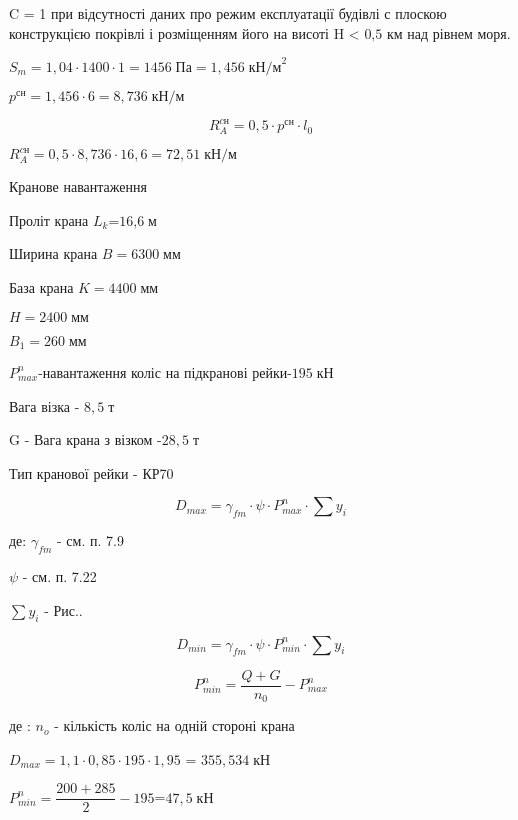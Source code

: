 \documentclass[a4paper,14pt]{article}
\begin{document}
C = 1 при відсутності даних про режим експлуатації будівлі с плоскою конструкцією покрівлі і розміщенням його на висоті H < ${\textit{0,5}}$ км над рівнем моря.

$S_m=1,04\cdot 1400\cdot 1=1456\;\textit{Па}=1,456\;{\textit{кН/м}}^2$

$p^{\textit{сн}}=1,456\cdot 6=8,736\;\textit{кН/м}$

\begin{equation}
    R^{\textit{cн}}_A=0,5\cdot p^{\textit{сн}}\cdot l_0
\end{equation}

$R^{\textit{cн}}_A=0,5\cdot 8,736 \cdot 16,6 = 72,51\;\textit{кН/м}$

Кранове навантаження

Проліт крана $L_k$=$\textit{16,6}\;\textit{м}$

Ширина крана $B=6300\;\textit{мм}$

База крана $K=4400\;\textit{мм}$

$H=2400\;\textit{мм}$

$B_1=260\;\textit{мм}$

$P^n_{max}$-навантаження коліс на підкранові рейки-$195\;\textit{кН}$

Вага візка - $8,5\;\textit{т}$

G - Вага крана з візком -$28,5\;\textit{т}$

Тип кранової рейки - КР70



\begin{equation}
    D_{max}=\gamma_{fm}\cdot \psi \cdot P^n_{max} \cdot \sum y_i
\end{equation}

де: $\gamma_{fm}$ - см. п. 7.9 %

$\psi$ - см. п. 7.22 %

$\sum y_i$ - Рис..

\begin{equation}
    D_{min}=\gamma_{fm}\cdot \psi \cdot P^n_{min} \cdot \sum y_i
\end{equation}

\begin{equation}
P^n_{min} = \dfrac {Q+G}{n_0}-P^n_{max}
\end{equation}

де : $n_o$ - кількість коліс на одній стороні крана

$D_{max}=1,1\cdot 0,85 \cdot 195 \cdot 1,95$ = $355,534\;\textit{кН}$

$P^n_{min} = \dfrac {200+285}{2}-195$=$47,5\;\textit{кН}$
\end{document}
